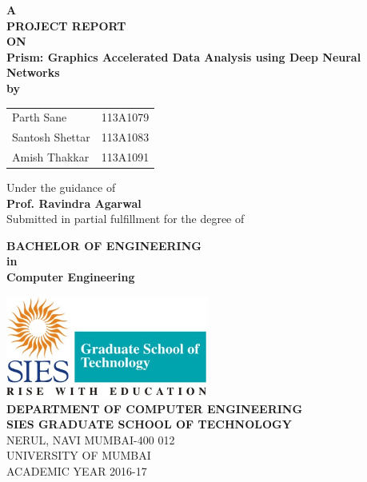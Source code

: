 

\begin{titlepage}
\begin{center}
\textup{\small {\bf A } \\
	 \textbf{PROJECT REPORT}}\\
 \small\textbf{ON}\\[0.3in]

\Large \textbf {Prism: Graphics Accelerated Data Analysis using Deep Neural Networks}\\[0.2in]
\small \textbf{by}\\

\begin{table}[h]
	\centering
	\begin{tabular}{lr} 
		Parth Sane &  113A1079 \\
		Santosh Shettar &  113A1083 \\
		Amish Thakkar &  113A1091 \\    
	\end{tabular}
\end{table}

\vspace{.1in}
Under the guidance of\\
{\textbf{Prof. Ravindra Agarwal}}\\[0.2in]

       Submitted in partial fulfillment for the degree of
        \vspace{.2in}

       {\bf BACHELOR OF ENGINEERING \\in\\ Computer Engineering}\\[0.5in]

\vfill

\includegraphics[width=0.5\textwidth]{SIES_GST}\\[0.3in]

\textbf{DEPARTMENT OF COMPUTER ENGINEERING}\\
\normalsize
\textbf{SIES GRADUATE SCHOOL OF TECHNOLOGY}\\
\vspace{0.2cm}
NERUL, NAVI MUMBAI-400 012\\

UNIVERSITY OF MUMBAI\\
ACADEMIC YEAR 2016-17

\end{center}

\end{titlepage}

